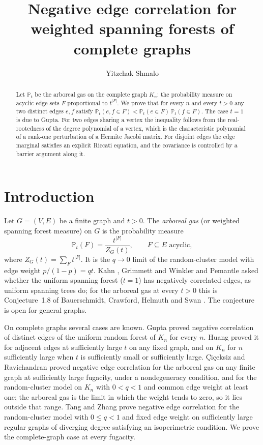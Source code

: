 \documentclass[11pt]{amsart}
\title[Forests of complete graphs]{Negative edge correlation for weighted spanning forests of complete graphs}
\author{Yitzchak Shmalo}
\date{}
\theoremstyle{remark}
\newcommand{\Pt}{\mathbb{P}_t}
\begin{document}
\begin{abstract}
Let $\Pt$ be the arboreal gas on the complete graph $K_n$: the probability measure on
acyclic edge sets $F$ proportional to $t^{|F|}$. We prove that for every $n$ and every
$t>0$ any two distinct edges $e,f$ satisfy $\Pt(e,f\in F)<\Pt(e\in F)\,\Pt(f\in F)$.
The case $t=1$ is due to Gupta. For two edges sharing a vertex the inequality follows
from the real-rootedness of the degree polynomial of a vertex, which is the
characteristic polynomial of a rank-one perturbation of a Hermite Jacobi matrix. For
disjoint edges the edge marginal satisfies an explicit Riccati equation, and the
covariance is controlled by a barrier argument along it.
\end{abstract}

\maketitle

\section{Introduction}

Let $G=(V,E)$ be a finite graph and $t>0$. The \emph{arboreal gas} (or weighted
spanning forest measure) on $G$ is the probability measure
\[
\Pt(F)=\frac{t^{|F|}}{Z_G(t)},\qquad F\subseteq E \text{ acyclic},
\]
where $Z_G(t)=\sum_F t^{|F|}$. It is the $q\to0$ limit of the random-cluster model with
edge weight $p/(1-p)=qt$. Kahn \cite{Kahn}, Grimmett and Winkler \cite{GW} and
Pemantle \cite{Pemantle} asked whether the uniform spanning forest ($t=1$) has
negatively correlated edges, as uniform spanning trees do; for the arboreal gas at every
$t>0$ this is Conjecture~1.8 of Bauerschmidt, Crawford, Helmuth and Swan \cite{BCHS}.
The conjecture is open for general graphs.

On complete graphs several cases are known. Gupta \cite{Gupta} proved negative
correlation of distinct edges of the uniform random forest of $K_n$ for every $n$.
Huang \cite{Huang} proved it for adjacent edges at sufficiently large $t$ on any fixed
graph, and on $K_n$ for $n$ sufficiently large when $t$ is sufficiently small or
sufficiently large. \c{C}i\c{c}eksiz and Ravichandran \cite{CR} proved negative edge
correlation for the arboreal gas on any finite graph at sufficiently large fugacity,
under a nondegeneracy condition, and for the random-cluster model on $K_n$ with
$0<q<1$ and common edge weight at least one; the arboreal gas is the limit in which the
weight tends to zero, so it lies outside that range. Tang and Zhang \cite{TZ} prove
negative edge correlation for the random-cluster model with $0\le q<1$ and fixed edge
weight on sufficiently large regular graphs of diverging degree satisfying an
isoperimetric condition. We prove the complete-graph case at
every fugacity.
\end{document}
